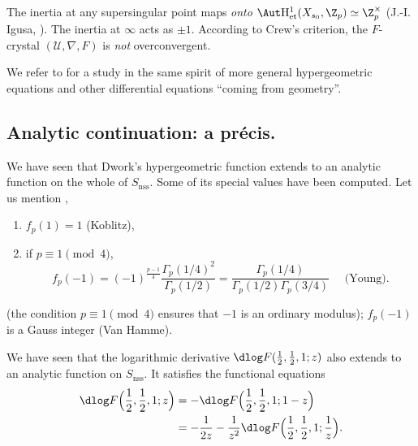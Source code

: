 The inertia at any supersingular point maps \emph{onto} $\Aut
\mathrm{H}^1_{\mathrm{et}}(X_{s_0},{\Z}_p)\simeq {\Z}_p^{\times}$ (J.-I. 
Igusa, \cf \eg \cite{anopu}).  The inertia at $\infty$ acts as $\pm1$.
According to Crew's criterion, the $F$-crystal $(\mathcal{U},\nabla,F)$
is \emph{not} overconvergent.

We refer to \cite{opm} for a study in the same spirit of more general
hypergeometric equations and other differential equations ``coming from
geometry''.

\subsection{Analytic continuation: a pr\'ecis.}\label{sub-analytic-cont}

\begin{para}
 We have seen that Dwork's hypergeometric function extends to an analytic
 function on the whole of $S_{\mathrm{nss}}$. Some of its special values
 have been computed.  Let us mention \cite{thfwpp}, \cite{anjsasvogphf}
 \begin{enumerate}
 \item $f_p(1)=1$ (Koblitz),
 \item if $p \equiv 1\pmod{4}$,
       \[
       f_p(-1) =
       (-1)^\frac{p-1}{4}\frac{\Gamma_p(1/4)^2}{\Gamma_p(1/2)} =
       \frac{\Gamma_p(1/4)}{\Gamma_p(1/2)\Gamma_p(3/4)} \quad\text{ (Young).}
       \]
 \end{enumerate}
 (the condition $p \equiv 1\pmod{4}$ ensures that $-1$ is an
 ordinary modulus); $f_p(-1)$ is a Gauss integer (Van Hamme).
\end{para}

\begin{para}
 We have seen that the logarithmic derivative
 $\dlog F(\frac{1}{2},\frac{1}{2},1;z) $ also extends to an analytic
 function on $S_{\mathrm{nss}}$.  It satisfies the functional equations
 \begin{align*}
  \dlog F\Bigl(\frac{1}{2},\frac{1}{2},1;z\Bigr)
   & = -\dlog F\Bigl(\frac{1}{2},\frac{1}{2},1;1-z\Bigr)\\
   & = -\frac{1}{2z} - \frac{1}{z^2}
   \dlog F\Bigl(\frac{1}{2},\frac{1}{2},1;\frac{1}{z}\Bigr).
 \end{align*}
\end{para}

